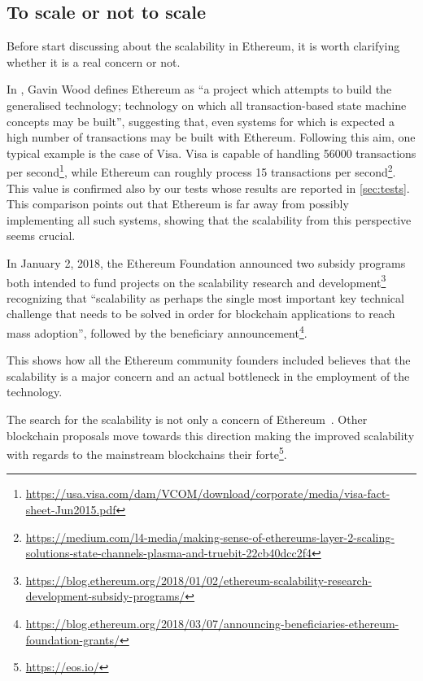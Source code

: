 \subsection{To scale or not to scale}
\label{sec:to-scale-or-not}

Before start discussing about the scalability in Ethereum, it is worth
clarifying whether it is a real concern or not.

In \cite{wood2018ethereum}, Gavin Wood defines Ethereum as ``a project which
attempts to build the generalised technology; technology on which all
transaction-based state machine concepts may be built'', suggesting that, even
systems for which is expected a high number of transactions may be built with
Ethereum. Following this aim, one typical example is the case of Visa. Visa is
capable of handling 56000 transactions per
second\footnote{\url{https://usa.visa.com/dam/VCOM/download/corporate/media/visa-fact-sheet-Jun2015.pdf}},
while Ethereum can roughly process 15 transactions per
second\footnote{\url{https://medium.com/l4-media/making-sense-of-ethereums-layer-2-scaling-solutions-state-channels-plasma-and-truebit-22cb40dcc2f4}}.
This value is confirmed also by our tests whose results are reported in
\autoref{sec:tests}. This comparison points out that Ethereum is far away from
possibly implementing all such systems, showing that the scalability from this
perspective seems crucial.

In January 2, 2018, the Ethereum Foundation announced two subsidy programs both
intended to fund projects on the scalability research and
development\footnote{\url{https://blog.ethereum.org/2018/01/02/ethereum-scalability-research-development-subsidy-programs/}}
recognizing that ``scalability as perhaps the single most important key
technical challenge that needs to be solved in order for blockchain applications
to reach mass adoption'', followed by the beneficiary
announcement\footnote{\url{https://blog.ethereum.org/2018/03/07/announcing-beneficiaries-ethereum-foundation-grants/}}.

This shows how all the Ethereum community founders included believes that the
scalability is a major concern and an actual bottleneck in the employment of the
technology.

The search for the scalability is not only a concern of
Ethereum~\cite{bib:the-quest}. Other blockchain proposals move towards this
direction making the improved scalability with regards to the mainstream
blockchains their forte\footnote{\url{https://eos.io/}}.
